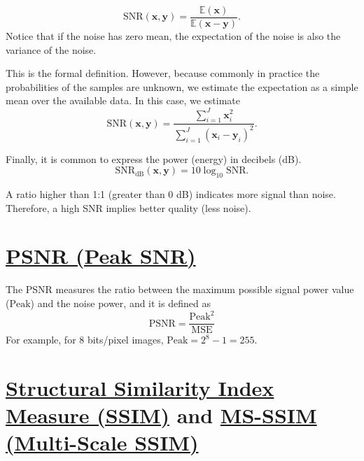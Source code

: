 \begin{equation}
  \text{SNR}(\mathbf{x},\mathbf{y}) = \frac{\mathbb{E}(\mathbf{x})}{\mathbb{E}(\mathbf{x} - \mathbf{y})}.
  \label{eq:formal_SNR}
\end{equation}
Notice that if the noise has zero mean, the expectation
of the noise is also the variance of the noise.

This is the formal definition. However, because commonly in
practice the probabilities of the samples are unknown, we estimate the
expectation as a simple mean over the available data. In this case,
we estimate
\begin{equation}
  \text{SNR}(\mathbf{x},\mathbf{y}) = \frac{\sum_{i=1}^J\mathbf{x}_i^2}{\sum_{i=1}^J(\mathbf{x}_i - \mathbf{y}_i)^2}.
  \label{eq:estimated_SNR}
\end{equation}

Finally, it is common to express the power (energy) in decibels (dB).
\begin{equation}
  \text{SNR}_{\text{dB}}(\mathbf{x},\mathbf{y}) = 10\log_{10}\text{SNR}.
  \label{eq:estimated_SNR_in_dBs}
\end{equation}

A ratio higher than 1:1 (greater than 0 dB) indicates more signal than
noise. Therefore, a high SNR implies better quality (less noise).


\section{\href{https://en.wikipedia.org/wiki/Peak_signal-to-noise_ratio}{PSNR (Peak SNR)}}

The PSNR measures the ratio between the maximum possible signal power
value ($\text{Peak}$) and the noise power, and it is defined as
\begin{equation}
  \text{PSNR} = \frac{\text{Peak}^2}{\text{MSE}}
  \label{eq:PSNR}
\end{equation}
For example, for 8 bits/pixel images, $\text{Peak}=2^8-1=255$.


\section{\href{https://en.wikipedia.org/wiki/Structural_similarity_index_measure}{Structural
    Similarity Index Measure (SSIM)} and
  \href{https://en.wikipedia.org/wiki/Structural_similarity_index_measure\#Multi-scale_SSIM}{MS-SSIM
    (Multi-Scale SSIM)}}

